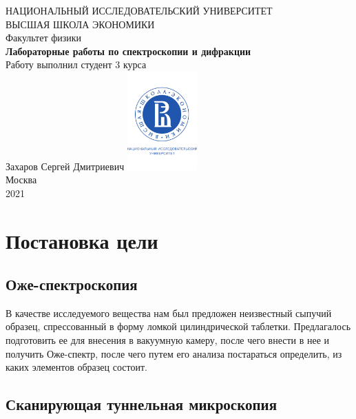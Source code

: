 \documentclass[a4paper, 12pt]{article}
\begin{document}
	\begin{titlepage}
		\begin{center}
			$$$$
			$$$$
			$$$$
			$$$$
			{\Large{НАЦИОНАЛЬНЫЙ ИССЛЕДОВАТЕЛЬСКИЙ УНИВЕРСИТЕТ}}\\
			\vspace{0.1cm}
			{\Large{ВЫСШАЯ ШКОЛА ЭКОНОМИКИ}}\\
			\vspace{0.25cm}
			{\large{Факультет физики}}\\
			\vspace{5.5cm}
			{\Huge\textbf{{Лабораторные работы по спектроскопии и дифракции}}}\\%
			\vspace{1cm}
			{Работу выполнил студент 3 курса}\\
			{Захаров Сергей Дмитриевич}
			\vfill
			\includegraphics[width = 0.2\textwidth]{HSElogo}\\
			\vfill
			Москва\\
			2021
		\end{center}
	\end{titlepage}
	
	\tableofcontents
	
	\newpage
	
	\section{Постановка цели}
	
	\subsection{Оже-спектроскопия}
	
	В качестве исследуемого вещества нам был предложен неизвестный сыпучий образец, спрессованный в форму ломкой цилиндрической таблетки. Предлагалось подготовить ее для внесения в вакуумную камеру, после чего внести в нее и получить Оже-спектр, после чего путем его анализа постараться определить, из каких элементов образец состоит.
	
	\subsection{Сканирующая туннельная микроскопия}
	
\end{document}
